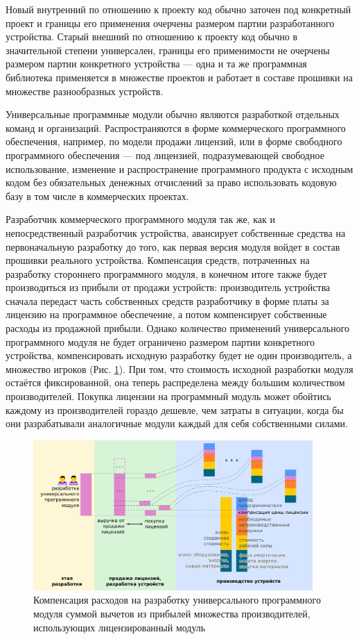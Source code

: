 \documentclass{article}
\begin{document}
Новый внутренний по отношению к проекту код обычно заточен под конкретный проект и границы его применения очерчены размером партии разработанного устройства. Старый внешний по отношению к проекту код обычно в значительной степени универсален, границы его применимости не очерчены размером партии конкретного устройства — одна и та же программная библиотека применяется в множестве проектов и работает в составе прошивки на множестве разнообразных устройств.

Универсальные программные модули обычно являются разработкой отдельных команд и организаций. Распространяются в форме коммерческого программного обеспечения, например, по модели продажи лицензий, или в форме свободного программного обеспечения — под лицензией, подразумевающей свободное использование, изменение и распространение программного продукта с исходным кодом без обязательных денежных отчислений за право использовать кодовую базу в том числе в коммерческих проектах.

Разработчик коммерческого программного модуля так же, как и непосредственный разработчик устройства, авансирует собственные средства на первоначальную разработку до того, как первая версия модуля войдет в состав прошивки реального устройства. Компенсация средств, потраченных на разработку стороннего программного модуля, в конечном итоге также будет производиться из прибыли от продажи устройств: производитель устройства сначала передаст часть собственных средств разработчику в форме платы за лицензию на программное обеспечение, а потом компенсирует собственные расходы из продажной прибыли. Однако количество применений универсального программного модуля не будет ограничено размером партии конкретного устройства, компенсировать исходную разработку будет не один производитель, а множество игроков (Рис. \ref{fig:model_hard_soft_license_module}). При том, что стоимость исходной разработки модуля остаётся фиксированной, она теперь распределена между большим количеством производителей. Покупка лицензии на программный модуль может обойтись каждому из производителей гораздо дешевле, чем затраты в ситуации, когда бы они разрабатывали аналогичные модули каждый для себя собственными силами.

\begin{figure}[ht]
    \centering
    \includegraphics[width=0.95\textwidth]{model-hard-soft-license-module}
    \caption{Компенсация расходов на разработку универсального программного модуля суммой вычетов из прибылей множества производителей, использующих лицензированный модуль}
    \label{fig:model_hard_soft_license_module}
\end{figure}
\end{document}
